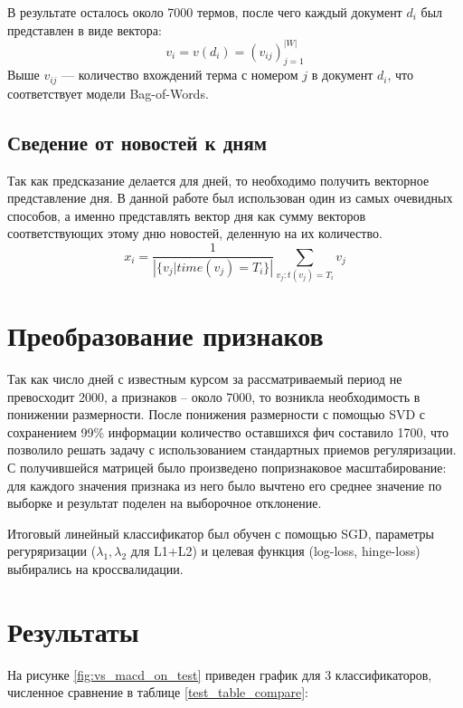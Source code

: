 \documentclass[pdftex,ptm,14pt,a4paper]{extreport}
\begin{document}
В результате осталось около 7000 термов, после чего каждый документ $d_i$ был представлен в виде вектора:
\begin{equation}
v_i = v(d_i) = (v_{ij})_{j=1}^{|W|}
\end{equation}
Выше $v_{ij}$ --- количество вхождений терма с номером $j$ в документ $d_i$, что соответствует модели Bag-of-Words.

\subsection{Сведение от новостей к дням}

Так как предсказание делается для дней, то необходимо получить векторное представление дня.
В данной работе был использован один из самых очевидных способов, а именно представлять вектор дня как сумму векторов соответствующих этому дню новостей, деленную на их количество.
\begin{equation}
x_i = \frac{1}{\left|\{v_j | time(v_j)=T_i\}\right|} \sum_{v_j: t(v_j)=T_i} v_j
\end{equation}

\section{Преобразование признаков}

Так как число дней с известным курсом за рассматриваемый период не превосходит 2000, а признаков -- около 7000, то возникла
необходимость в понижении размерности. После понижения размерности с помощью SVD\cite{svd} с сохранением
99\% информации количество оставшихся фич составило 1700, что позволило решать задачу с использованием стандартных
приемов регуляризации. С получившейся матрицей было произведено попризнаковое
масштабирование: для каждого значения признака из него было вычтено его среднее значение по выборке и результат поделен на
выборочное отклонение.

Итоговый линейный классификатор был обучен с помощью SGD\cite{sgd}, параметры регуряризации ($\lambda_1,\lambda_2$ для L1+L2)
и целевая функция (log-loss, hinge-loss) выбирались на кроссвалидации.

\section{Результаты}

На рисунке \ref{fig:vs_macd_on_test} приведен график для 3 классификаторов, численное сравнение в таблице \ref{test_table_compare}:
\end{document}
